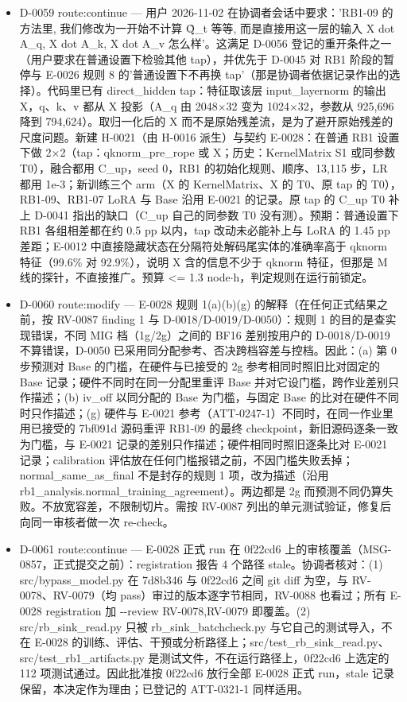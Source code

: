 \documentclass[11pt]{article}
\begin{document}
\begin{itemize}
\item D-0059 route:continue --- 用户 2026-11-02 在协调者会话中要求：'RB1-09 的方法里, 我们修改为一开始不计算 Q̃\_t 等等, 而是直接用这一层的输入 X dot A\_q, X dot A\_k, X dot A\_v 怎么样'。这满足 D-0056 登记的重开条件之一（用户要求在普通设置下检验其他 tap），并优先于 D-0045 对 RB1 阶段的暂停与 E-0026 规则 8 的'普通设置下不再换 tap'（那是协调者依据记录作出的选择）。代码里已有 direct\_hidden tap：特征取该层 input\_layernorm 的输出 X，q、k、v 都从 X 投影（A\_q 由 2048\ensuremath{\times}32 变为 1024\ensuremath{\times}32，参数从 925,696 降到 794,624）。取归一化后的 X 而不是原始残差流，是为了避开原始残差的尺度问题。新建 H-0021（由 H-0016 派生）与契约 E-0028：在普通 RB1 设置下做 2\ensuremath{\times}2（tap：qknorm\_pre\_rope 或 X；历史：KernelMatrix S1 或同参数 T0），融合都用 C\_up，seed 0，RB1 的初始化规则、顺序、13,115 步，LR 都用 1e-3；新训练三个 arm（X 的 KernelMatrix、X 的 T0、原 tap 的 T0），RB1-09、RB1-07 LoRA 与 Base 沿用 E-0021 的记录。原 tap 的 C\_up T0 补上 D-0041 指出的缺口（C\_up 自己的同参数 T0 没有测）。预期：普通设置下 RB1 各组相差都在约 0.5 pp 以内，tap 改动未必能补上与 LoRA 的 1.45 pp 差距；E-0012 中直接隐藏状态在分隔符处解码尾实体的准确率高于 qknorm 特征（99.6\% 对 92.9\%），说明 X 含的信息不少于 qknorm 特征，但那是 M 线的探针，不直接推广。预算 \textless{}= 1.3 node\ensuremath{\cdot}h，判定规则在运行前锁定。
\item D-0060 route:modify --- E-0028 规则 1(a)(b)(g) 的解释（在任何正式结果之前，按 RV-0087 finding 1 与 D-0018/D-0019/D-0050）：规则 1 的目的是查实现错误，不同 MIG 档（1g/2g）之间的 BF16 差别按用户的 D-0018/D-0019 不算错误，D-0050 已采用同分配参考、否决跨档容差与控档。因此：(a) 第 0 步预测对 Base 的门槛，在硬件与已接受的 2g 参考相同时照旧比对固定的 Base 记录；硬件不同时在同一分配里重评 Base 并对它设门槛，跨作业差别只作描述；(b) iv\_off 以同分配的 Base 为门槛，与固定 Base 的比对在硬件不同时只作描述；(g) 硬件与 E-0021 参考（ATT-0247-1）不同时，在同一作业里用已接受的 7bf091d 源码重评 RB1-09 的最终 checkpoint，新旧源码逐条一致为门槛，与 E-0021 记录的差别只作描述；硬件相同时照旧逐条比对 E-0021 记录；calibration 评估放在任何门槛报错之前，不因门槛失败丢掉；normal\_same\_as\_final 不是封存的规则 1 项，改为描述（沿用 rb1\_analysis.normal\_training\_agreement）。两边都是 2g 而预测不同仍算失败。不放宽容差，不限制切片。需按 RV-0087 列出的单元测试验证，修复后向同一审核者做一次 re-check。
\item D-0061 route:continue --- E-0028 正式 run 在 0f22cd6 上的审核覆盖（MSG-0857，正式提交之前）：registration 报告 4 个路径 stale。协调者核对：(1) src/bypass\_model.py 在 7d8b346 与 0f22cd6 之间 git diff 为空，与 RV-0078、RV-0079（均 pass）审过的版本逐字节相同，RV-0088 也看过；所有 E-0028 registration 加 -{}-review RV-0078,RV-0079 即覆盖。(2) src/rb\_sink\_read.py 只被 rb\_sink\_batchcheck.py 与它自己的测试导入，不在 E-0028 的训练、评估、干预或分析路径上；src/test\_rb\_sink\_read.py、src/test\_rb1\_artifacts.py 是测试文件，不在运行路径上，0f22cd6 上选定的 112 项测试通过。因此批准按 0f22cd6 放行全部 E-0028 正式 run，stale 记录保留，本决定作为理由；已登记的 ATT-0321-1 同样适用。

\end{itemize}
\end{document}
